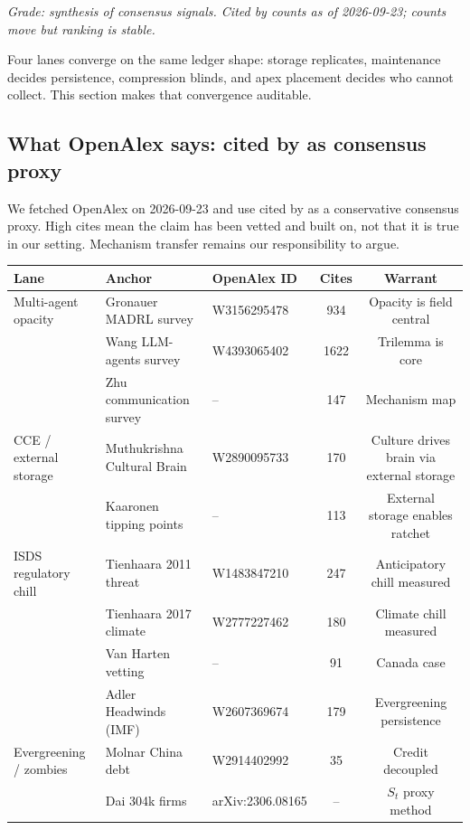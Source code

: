 \documentclass[11pt]{article}
\begin{document}
\textit{Grade: synthesis of consensus signals. Cited by counts as of 2026-09-23; counts move but ranking is stable.}

Four lanes converge on the same ledger shape: storage replicates, maintenance decides persistence, compression blinds, and apex placement decides who cannot collect. This section makes that convergence auditable.

\subsection{What OpenAlex says: cited by as consensus proxy}
We fetched OpenAlex on 2026-09-23 and use cited by as a conservative consensus proxy. High cites mean the claim has been vetted and built on, not that it is true in our setting. Mechanism transfer remains our responsibility to argue.

\begin{center}
\small
\begin{tabular}{p{2.8cm}p{4.8cm}lcc}
\toprule
Lane & Anchor & OpenAlex ID & Cites & Warrant \\
\midrule
Multi-agent opacity & Gronauer MADRL survey & W3156295478 & 934 & Opacity is field central \\
 & Wang LLM-agents survey & W4393065402 & 1622 & Trilemma is core \\
 & Zhu communication survey & -- & 147 & Mechanism map \\
CCE / external storage & Muthukrishna Cultural Brain & W2890095733 & 170 & Culture drives brain via external storage \\
 & Kaaronen tipping points & -- & 113 & External storage enables ratchet \\
ISDS regulatory chill & Tienhaara 2011 threat & W1483847210 & 247 & Anticipatory chill measured \\
 & Tienhaara 2017 climate & W2777227462 & 180 & Climate chill measured \\
 & Van Harten vetting & -- & 91 & Canada case \\
 & Adler Headwinds (IMF) & W2607369674 & 179 & Evergreening persistence \\
Evergreening / zombies & Molnar China debt & W2914402992 & 35 & Credit decoupled \\
 & Dai 304k firms & arXiv:2306.08165 & -- & $S_t$ proxy method \\
\bottomrule
\end{tabular}
\end{center}
\end{document}
